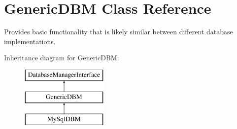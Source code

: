 \hypertarget{classGenericDBM}{\section{Generic\-D\-B\-M Class Reference}
\label{classGenericDBM}
}


Provides basic functionality that is likely similar between different database implementations.  


Inheritance diagram for Generic\-D\-B\-M\-:\begin{figure}[H]
\begin{center}
\leavevmode
\includegraphics[height=3.000000cm]{classGenericDBM}
\end{center}
\end{figure}
